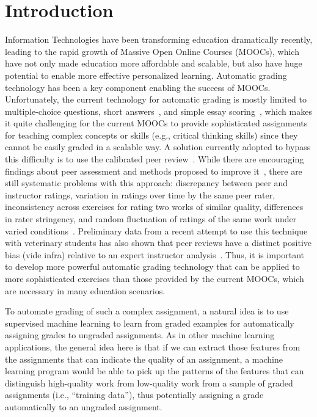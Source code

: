 \def\ignore#1{}
\section{Introduction}

Information Technologies have been transforming education dramatically
recently, leading to the rapid growth of Massive Open Online Courses
(MOOCs), which have not only made education more affordable and scalable,
but also have huge potential to enable more effective personalized
learning.  Automatic grading technology has been a key component enabling
the success of MOOCs. Unfortunately, the
current technology for automatic grading is mostly limited to multiple-choice
questions, short answers~\cite{Brooks:2014:Powergrading,
Leacock:2003:CatH, Mitchell:2002:ICAA, Pulman:2005:EdAppsNLP,
Mohler:2009:EACL}, and simple essay scoring~\cite{Balfour:2013}, which
makes it quite challenging for the current MOOCs to provide sophisticated
assignments for teaching complex concepts or skills (e.g., critical
thinking skills) since they cannot be easily graded in a scalable way. A
solution currently adopted to bypass this difficulty is to use the
calibrated peer review~\cite{Balfour:2013, Suen:2014, Piech:2013:EDM}.
While there are encouraging findings about peer assessment and methods
proposed to improve it~\cite{Kulkarni:2013, Piech:2013:EDM}, there are
still systematic problems with this approach: discrepancy between peer and
instructor ratings, variation in ratings over time by the same peer rater,
inconsistency across exercises for rating two works of similar quality,
differences in rater stringency, and random fluctuation of ratings of the
same work under varied conditions~\cite{Suen:2014}. Preliminary data from a
recent attempt to use this technique with veterinary students has also
shown that peer reviews have a distinct positive bias (vide infra) relative
to an expert instructor analysis~\cite{Ferguson:2014}. Thus, it is
important to develop more powerful automatic grading technology that can be
applied to more sophisticated exercises than those provided by the current
MOOCs, which are necessary in many education scenarios.

To automate grading of such a complex assignment, a natural idea is to use
supervised machine learning to learn from graded examples for automatically
assigning grades to ungraded assignments. As in other machine learning
applications, the general idea here is that if we can extract those
features from the assignments that can indicate the quality of an
assignment, a machine learning program would be able to pick up the
patterns of the features that can distinguish high-quality work from
low-quality work from a sample of graded assignments (i.e., ``training
data''), thus potentially assigning a grade automatically to an ungraded
assignment.

